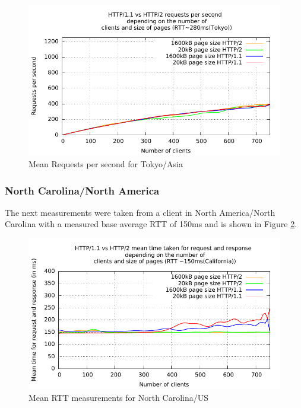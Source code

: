 \begin{figure}[H]
	\centering
	\includegraphics[scale=1,trim=0.0cm .0cm .0cm .0cm,clip]{images/reqps-asia.pdf}
	\caption{Mean Requests per second for Tokyo/Asia}
	\label{fig:reqps-asia}
\end{figure}

\subsubsection{North Carolina/North America}

The next measurements were taken from a client in North America/North Carolina with a measured base average RTT of 150ms and is shown in Figure \ref{fig:latency-na}. 

\begin{figure}[H]
	\centering
	\includegraphics[scale=1,trim=0.0cm .0cm .0cm .0cm,clip]{images/latency-na.pdf}
	\caption{Mean RTT measurements for North Carolina/US}
	\label{fig:latency-na}
\end{figure}

